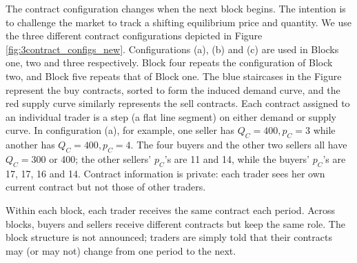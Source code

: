 \documentclass[12pt]{article}
\begin{document}
The contract configuration changes when the next block begins. 
The intention is to challenge the market to track a shifting equilibrium price and quantity.
We use the three different contract configurations depicted in Figure \ref{fig:3contract_configs_new}.
Configurations (a), (b) and (c) are used in Blocks one, two and three respectively.
Block four repeats the configuration of Block two, and Block five repeats that of Block one. 
The blue staircases in the Figure represent the buy contracts, sorted to form the induced demand curve, and the red supply curve similarly represents the sell contracts. 
Each contract assigned to an individual trader is a step (a flat line segment) on either demand or supply curve. 
In configuration (a), 
for example, one seller has $Q_{C}=400, p_{C}=3$ while another has $Q_{C}=400, p_{C}=4.$ 
The four buyers and the other two sellers all have 
$Q_{C}=300$ or 400; the other sellers' $p_C$'s are 11 and 14,
while the buyers' $p_C$'s are 17, 17, 16 and 14.
Contract information is private: each trader sees her own current contract but not those of other traders.

Within each block, each trader receives the same contract each period. Across blocks, buyers and sellers receive different contracts but keep the same role. The block structure is not announced; traders are simply told that their contracts may (or may not) change from one period to the next. 


\end{document}
